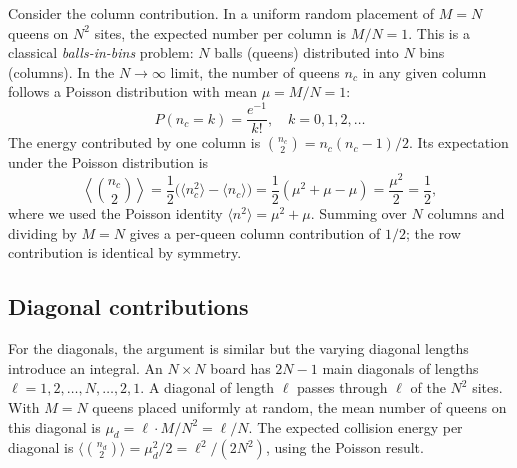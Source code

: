 \documentclass[aps, pre, reprint, amsmath, amssymb, superscriptaddress, floatfix]{revtex4-2}
\begin{document}
Consider the column contribution.  In a uniform random placement of
$M = N$ queens on $N^2$ sites, the expected number per column is
$M/N = 1$.  This is a classical \textit{balls-in-bins} problem:
$N$ balls (queens) distributed into $N$ bins (columns).  In the $N \to \infty$ limit,
the number of queens $n_c$ in any given column follows a Poisson
distribution with mean $\mu = M/N = 1$:
\begin{equation}
  P(n_c = k) = \frac{e^{-1}}{k!}, \quad k = 0, 1, 2, \ldots
  \label{eq:Poisson_col}
\end{equation}
The energy contributed by one column is $\binom{n_c}{2} =
n_c(n_c - 1)/2$.  Its expectation under the Poisson distribution is
\begin{equation}
  \left\langle \binom{n_c}{2} \right\rangle
  = \frac{1}{2}\bigl(\langle n_c^2 \rangle - \langle n_c \rangle\bigr)
  = \frac{1}{2}(\mu^2 + \mu - \mu) = \frac{\mu^2}{2} = \frac{1}{2},
  \label{eq:col_energy}
\end{equation}
where we used the Poisson identity $\langle n^2 \rangle = \mu^2 +
\mu$.  Summing over $N$ columns and dividing by $M = N$ gives a per-queen
column contribution of $1/2$; the row contribution is identical by
symmetry.

\subsection{Diagonal contributions}

For the diagonals, the argument is similar but the varying diagonal
lengths introduce an integral.  An $N \times N$ board has $2N - 1$
main diagonals of lengths $\ell = 1, 2, \ldots, N, \ldots, 2, 1$.
A diagonal of length $\ell$ passes through $\ell$ of the $N^2$ sites.
With $M = N$ queens placed uniformly at random, the mean number of
queens on this diagonal is $\mu_d = \ell \cdot M/N^2 = \ell/N$.
The expected collision energy per diagonal is
$\langle\binom{n_d}{2}\rangle = \mu_d^2/2 = \ell^2/(2N^2)$, using
the Poisson result.
\end{document}
